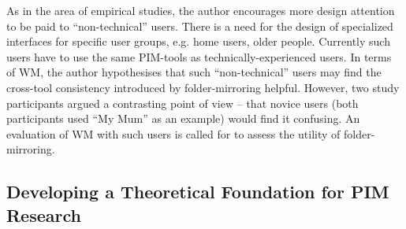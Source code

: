 As in the area of empirical studies, the author encourages more design attention to be paid to ``non-technical'' users.  There is a need for the design of specialized interfaces for specific user groups, e.g. home users, older people. Currently such users have to use the same PIM-tools as technically-experienced users.  In terms of WM, the author hypothesises that such ``non-technical'' users may find the cross-tool consistency introduced by folder-mirroring helpful.  However, two study participants argued a contrasting point of view -- that novice users (both participants used ``My Mum'' as an example) would find it confusing.  An evaluation of WM with such users is called for to assess the utility of folder-mirroring.





\newpage
\subsection{Developing a Theoretical Foundation for PIM Research}
\label{conclusion:future-work-methodological}


